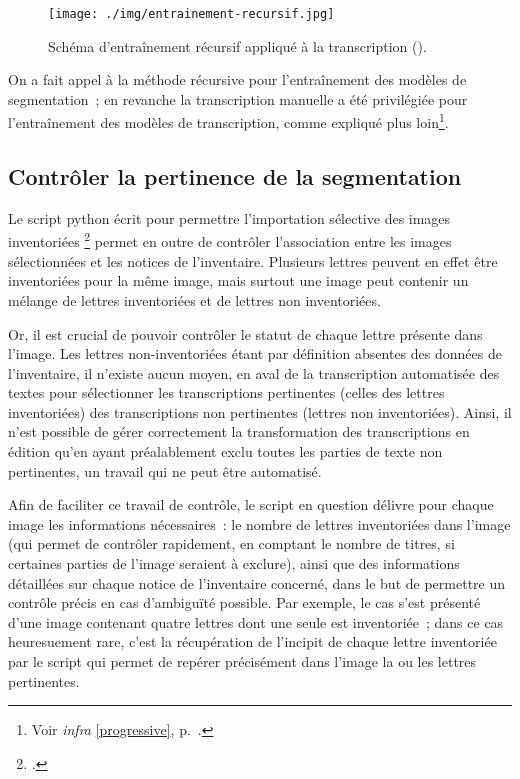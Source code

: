 \documentclass[a4paper,12pt,twoside]{book}
\begin{document}
    			\begin{figure}[!h]
    				\centering
    				\texttt{[image: ./img/entrainement-recursif.jpg]}
    				\caption{Schéma d'entraînement récursif appliqué à la transcription (\cite{pincheHTRPresentationProblematiques2021}).}
    				\label{fig}
    			\end{figure}
    			
    			On a fait appel à la méthode récursive pour l'entraînement des modèles de \gls{segmentation}~; en revanche la transcription manuelle a été privilégiée pour l'entraînement des modèles de transcription, comme expliqué plus loin\footnote{Voir \textit{infra} \ref{progressive}, p.~\pageref{progressive}.}.
	    		
	    	\subsection{Contrôler la pertinence de la \gls{segmentation}}
		    	\label{controle-segmentation-lettres-inventoriees}
	    		Le script python écrit pour permettre l'importation sélective des images inventoriées \footcite{biayDonneesImagesPy2022} permet en outre de contrôler l'association entre les images sélectionnées et les notices de l'inventaire. Plusieurs lettres peuvent en effet être inventoriées pour la même image, mais surtout une image peut contenir un mélange de lettres inventoriées et de lettres non inventoriées.
	    		
	    		Or, il est crucial de pouvoir contrôler le statut de chaque lettre présente dans l'image. Les lettres non-inventoriées étant par définition absentes des données de l'inventaire, il n'existe aucun moyen, en aval de la transcription automatisée des textes pour sélectionner les transcriptions pertinentes (celles des lettres inventoriées) des transcriptions non pertinentes (lettres non inventoriées). Ainsi, il n'est possible de gérer correctement la transformation des transcriptions en édition qu'en ayant préalablement exclu toutes les parties de texte non pertinentes, un travail qui ne peut être automatisé.
	    		
	    		Afin de faciliter ce travail de contrôle, le script en question délivre pour chaque image les informations nécessaires~: le nombre de lettres inventoriées dans l'image (qui permet de contrôler rapidement, en comptant le nombre de titres, si certaines parties de l'image seraient à exclure), ainsi que des informations détaillées sur chaque notice de l'inventaire concerné, dans le but de permettre un contrôle précis en cas d'ambiguïté possible. Par exemple, le cas s'est présenté d'une image contenant quatre lettres dont une seule est inventoriée~; dans ce cas heuresuement rare, c'est la récupération de l'incipit de chaque lettre inventoriée par le script qui permet de repérer précisément dans l'image la ou les lettres pertinentes.
				
\end{document}
